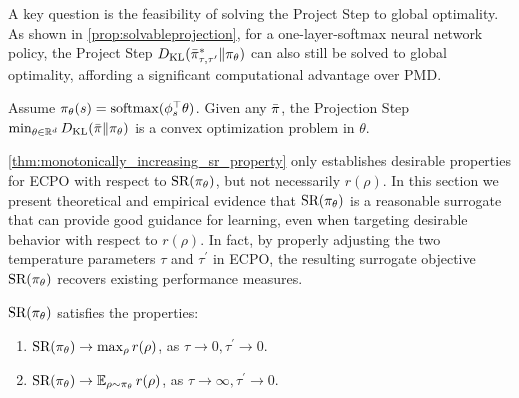 A key question is the feasibility of solving the
Project Step to global optimality.
As shown in \cref{prop:solvableprojection}, 
for a one-layer-softmax neural network policy,
the Project Step $D_{\mathrm{KL}}( \bar{\pi}_{\tau,\tau^{\prime}}^* \| \pi_\theta)$
can also still be solved to global optimality,
affording a significant computational advantage over PMD.

\begin{prop}
\label{prop:solvableprojection}
Assume $\pi_\theta(s) = \mathrm{softmax}(\phi_s^{\top}\theta)$.
Given any $\bar{\pi}$,
the Projection Step
$\min\nolimits_{\theta \in \mathbb{R}^d}{D_{\mathrm{KL}}(\bar{\pi} \| \pi_\theta)}$
is a convex optimization problem in $\theta$.
\end{prop}


\if
\label{subsec:sr}


\cref{thm:monotonically_increasing_sr_property} only establishes
desirable properties for ECPO with respect to $\text{SR}(\pi_\theta)$,
but not necessarily $r(\rho)$.
In this section we present theoretical and empirical evidence that
$\text{SR}(\pi_\theta)$ is a reasonable surrogate 
that can provide good guidance for learning,
even when targeting desirable behavior with respect to $r(\rho)$.
In fact, by properly adjusting the two temperature parameters $\tau$ and
$\tau^{\prime}$ in ECPO,
the resulting surrogate objective $\text{SR}(\pi_\theta)$
recovers existing performance measures.

\begin{prop}
\label{prop:sr}
$\text{SR}(\pi_\theta)$ satisfies the properties:
\begin{enumerate}[label=(\roman*)]
	\item  $\text{SR}(\pi_\theta) \to \max_{\rho}{r(\rho)}$, as $\tau \to 0, \tau^{\prime} \to 0$.
	\item $\text{SR}(\pi_\theta) \to \operatorname*{\mathbb{E}}_{\rho \sim \pi_\theta}{r(\rho)}$, as $\tau \to \infty, \tau^{\prime} \to 0$. 
\end{enumerate}	
\end{prop}

